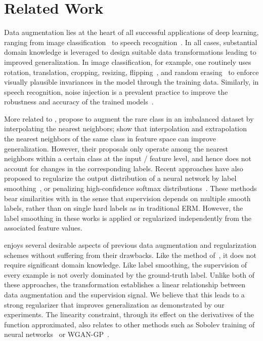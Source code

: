 \section{Related Work}
\label{sec:related}

Data augmentation lies at the heart of all successful applications of deep
learning, ranging from image classification~\citep{krizhevsky2012imagenet} to
speech recognition~\citep{graves2013speech, amodei2016deep}. In all cases,
substantial domain knowledge is leveraged to design suitable data
transformations leading to improved generalization. In image classification,
for example, one routinely uses rotation, translation, cropping, resizing,
flipping~\citep{lecun98, simonyan2014very}, and random
erasing~\citep{zhong2017random} to enforce visually plausible invariances in
the model through the training data. Similarly, in speech recognition, noise
injection is a prevalent practice to improve the robustness and accuracy of the
trained models~\citep{amodei2016deep}. 

More related to \mixup{}, \citet{chawla2002smote} propose to augment the rare class in an imbalanced dataset by interpolating the nearest neighbors; \citet{devries2017dataset} show that interpolation
and extrapolation the nearest neighbors of the same class in feature space can improve generalization. However, their
proposals only operate among the nearest neighbors within a certain class at the input / feature level, and hence does not account for changes in
the corresponding labels. Recent approaches have also proposed to regularize
the output distribution of a neural network by label
smoothing~\citep{szegedy2016rethinking}, or penalizing high-confidence softmax
distributions~\citep{pereyra2017regularizing}. These methods bear similarities
with \mixup{} in the sense that supervision depends on multiple smooth labels,
rather than on single hard labels as in traditional ERM. However, the label
smoothing in these works is applied or regularized independently from the
associated feature values.

\mixup{} enjoys several desirable aspects of previous data augmentation and
regularization schemes without suffering from their drawbacks. Like the method
of~\cite{devries2017dataset}, it does not require significant domain knowledge.
Like label smoothing, the supervision of every example is not overly dominated
by the ground-truth label. Unlike both of these approaches, the \mixup{}
transformation establishes a linear relationship between data augmentation and
the supervision signal. We believe that this leads to a strong regularizer that
improves generalization as demonstrated by our experiments. The linearity
constraint, through its effect on the derivatives of the function approximated,
also relates \mixup{} to other methods such as Sobolev training of neural
networks~\citep{czarnecki2017sobolev} or WGAN-GP~\citep{gulrajani2017improved}.
